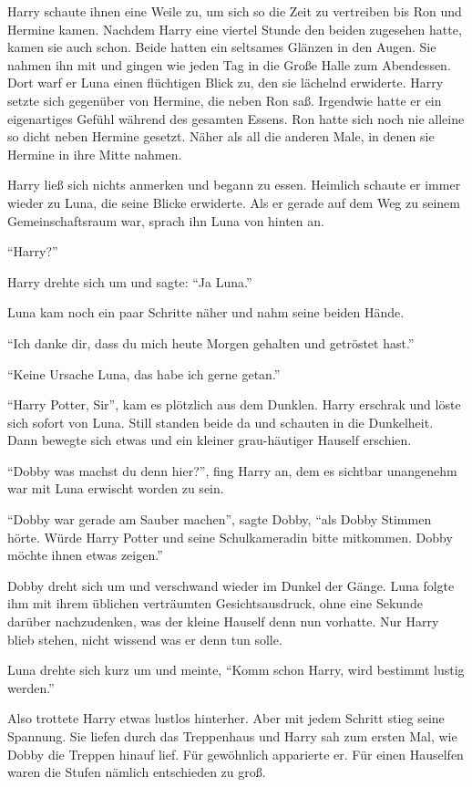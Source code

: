 Harry schaute ihnen eine Weile zu, um sich so die Zeit zu vertreiben bis Ron und Hermine kamen. Nachdem Harry eine viertel Stunde den beiden zugesehen hatte, kamen sie auch schon. Beide hatten ein seltsames Glänzen in den Augen. Sie nahmen ihn mit und gingen wie jeden Tag in die Große Halle zum Abendessen. Dort warf er Luna einen flüchtigen Blick zu, den sie lächelnd erwiderte. Harry setzte sich gegenüber von Hermine, die neben Ron saß. Irgendwie hatte er ein eigenartiges Gefühl während des gesamten Essens. Ron hatte sich noch nie alleine so dicht neben Hermine gesetzt. Näher als all die anderen Male, in denen sie Hermine in ihre Mitte nahmen.

Harry ließ sich nichts anmerken und begann zu essen. Heimlich schaute er immer wieder zu Luna, die seine Blicke erwiderte. Als er gerade auf dem Weg zu seinem Gemeinschaftsraum war, sprach ihn Luna von hinten an.

\enquote{Harry?}

Harry drehte sich um und sagte: \enquote{Ja Luna.}

Luna kam noch ein paar Schritte näher und nahm seine beiden Hände.

\enquote{Ich danke dir, dass du mich heute Morgen gehalten und getröstet hast.}

\enquote{Keine Ursache Luna, das habe ich gerne getan.}

\enquote{Harry Potter, Sir}, kam es plötzlich aus dem Dunklen. Harry erschrak und löste sich sofort von Luna. Still standen beide da und schauten in die Dunkelheit. Dann bewegte sich etwas und ein kleiner grau-häutiger Hauself erschien.

\enquote{Dobby \gst was machst du denn hier?}, fing Harry an, dem es sichtbar unangenehm war mit Luna erwischt worden zu sein.

\enquote{Dobby war gerade am Sauber machen}, sagte Dobby, \enquote{als Dobby Stimmen hörte. Würde Harry Potter und seine Schulkameradin bitte mitkommen. Dobby möchte ihnen etwas zeigen.}

Dobby dreht sich um und verschwand wieder im Dunkel der Gänge. Luna folgte ihm mit ihrem üblichen verträumten Gesichtsausdruck, ohne eine Sekunde darüber nachzudenken, was der kleine Hauself denn nun vorhatte. Nur Harry blieb stehen, nicht wissend was er denn tun solle.

Luna drehte sich kurz um und meinte, \enquote{Komm schon Harry, wird bestimmt lustig werden.}

Also trottete Harry etwas lustlos hinterher. Aber mit jedem Schritt stieg seine Spannung. Sie liefen durch das Treppenhaus und Harry sah zum ersten Mal, wie Dobby die Treppen hinauf lief. Für gewöhnlich apparierte er. Für einen Hauselfen waren die Stufen nämlich entschieden zu groß.

